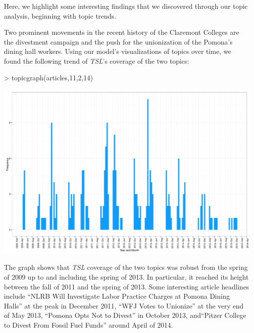 \documentclass[a4paper]{article}
\begin{document}
Here, we highlight some interesting findings that we discovered through our topic analysis, beginning with topic trends.

Two prominent movements in the recent history of the Claremont Colleges are the divestment campaign and the push for the unionization of the Pomona's dining hall workers. Using our model's visualizations of topics over time, we found the following trend of \textit{TSL}'s coverage of the two topics:

\begin{Schunk}
\begin{Sinput}
> topicgraph(articles,11,2,14)
\end{Sinput}
\end{Schunk}
\includegraphics{FinalProject-007}

The graph shows that \textit{TSL} coverage of the two topics was robust from the spring of 2009 up to and including the spring of 2013. In particular, it reached its height between the fall of 2011 and the spring of 2013. Some interesting article headlines include ``NLRB Will Investigate Labor Practice Charges at Pomona Dining Halls'' at the peak in December 2011, ``WFJ Votes to Unionize'' at the very end of May 2013, ``Pomona Opts Not to Divest'' in October 2013, and``Pitzer College to Divest From Fossil Fuel Funds'' around April of 2014.
\end{document}
